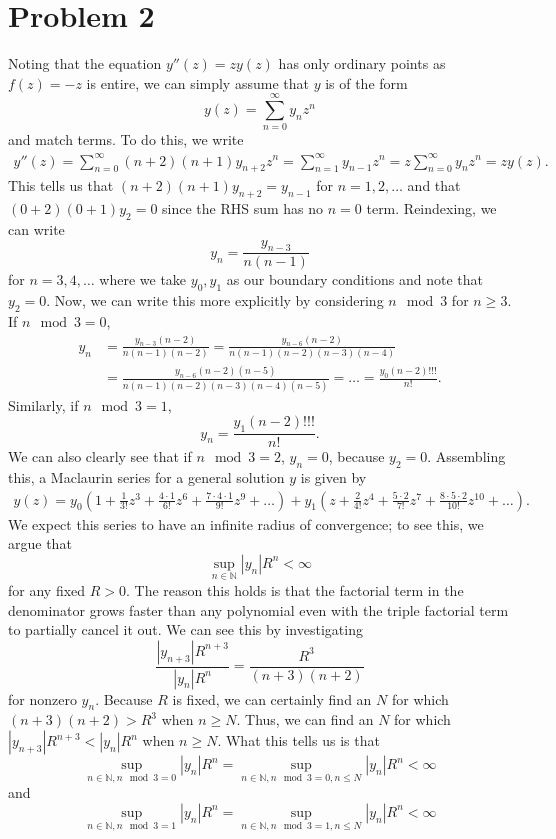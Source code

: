 \documentclass{article}
\begin{document}
\section{Problem 2}
Noting that the equation $y''(z)=zy(z)$ has only ordinary points as $f(z)=-z$ is entire, we can simply assume that $y$ is of the form
\[
y(z)=\sum_{n=0}^\infty y_nz^n
\]
and match terms. To do this, we write 
\begin{align*}
y''(z)=\sum_{n=0}^\infty(n+2)(n+1)y_{n+2}z^n=\sum_{n=1}^\infty y_{n-1}z^n=z\sum_{n=0}^\infty y_nz^n=zy(z).
\end{align*}
This tells us that $(n+2)(n+1)y_{n+2}=y_{n-1}$ for $n=1,2,\ldots$ and that $(0+2)(0+1)y_2=0$ since the RHS sum has no $n=0$ term. Reindexing, we can write
\[
y_n=\frac{y_{n-3}}{n(n-1)}
\]
for $n=3,4,\ldots$ where we take $y_0,y_1$ as our boundary conditions and note that $y_2=0$. Now, we can write this more explicitly by considering $n\mod3$ for $n\geq3$. If $n\mod3=0$,
\begin{align*}
y_n&=\frac{y_{n-3}(n-2)}{n(n-1)(n-2)}=\frac{y_{n-6}(n-2)}{n(n-1)(n-2)(n-3)(n-4)}\\&=
\frac{y_{n-6}(n-2)(n-5)}{n(n-1)(n-2)(n-3)(n-4)(n-5)}=\ldots=\frac{y_0(n-2)!!!}{n!}.
\end{align*}
Similarly, if $n\mod3=1$,
\[
y_n=\frac{y_1(n-2)!!!}{n!}.
\]
We can also clearly see that if $n\mod3=2$, $y_n=0$, because $y_2=0$. Assembling this, a Maclaurin series for a general solution $y$ is given by
\begin{align*}
y(z)=y_0\left(1+\frac{1}{3!}z^3+\frac{4\cdot 1}{6!}z^6+\frac{7\cdot4\cdot1}{9!}z^9+\ldots\right)+y_1\left(z+\frac{2}{4!}z^4+\frac{5\cdot 2}{7!}z^7+\frac{8\cdot5\cdot2}{10!}z^{10}+\ldots\right).
\end{align*}
We expect this series to have an infinite radius of convergence; to see this, we argue that 
\[
\sup_{n\in\mathbb{N}}|y_n|R^n<\infty
\]
for any fixed $R>0$. The reason this holds is that the factorial term in the denominator grows faster than any polynomial even with the triple factorial term to partially cancel it out. We can see this by investigating 
\[
\frac{|y_{n+3}|R^{n+3}}{|y_n|R^n}=\frac{R^3}{(n+3)(n+2)}
\]
for nonzero $y_n$. Because $R$ is fixed, we can certainly find an $N$ for which $(n+3)(n+2)>R^3$ when $n\geq N$. Thus, we can find an $N$ for which $|y_{n+3}|R^{n+3}<|y_n|R^n$ when $n\geq N$. What this tells us is that 
\[
\sup_{n\in\mathbb{N},n\mod3=0}|y_n|R^n=\sup_{n\in\mathbb{N},n\mod3=0,n\leq N}|y_n|R^n<\infty
\]
and 
\[
\sup_{n\in\mathbb{N},n\mod3=1}|y_n|R^n=\sup_{n\in\mathbb{N},n\mod3=1,n\leq N}|y_n|R^n<\infty
\]
\end{document}
